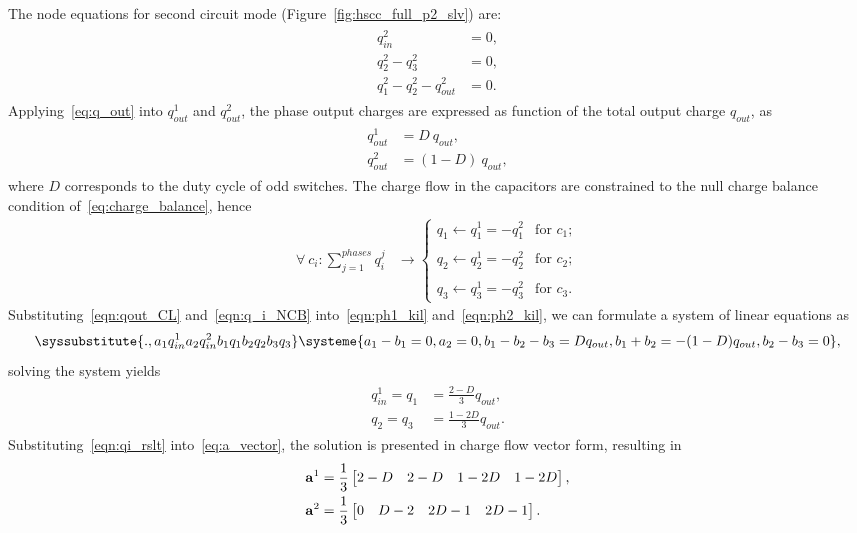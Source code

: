 The node equations for second circuit mode (Figure~\ref{fig:hscc_full_p2_slv}) are:
\begin{align}
\label{eqn:ph2_kil}
\begin{split}
  q_{in}^2 & = 0,\\
  q_2^2 - q_3^2    &=0, \\
  q_1^2 - q_2^2 - q_{out}^2 &=0.
\end{split}
\end{align}
Applying~\eqref{eq:q_out} into $q_{out}^1$ and $q_{out}^2$, the phase output charges are expressed as function of the total output charge $q_{out}$, as
\begin{align}
\label{eqn:qout_CL}
\begin{split}
  q_{out}^1 & = D~q_{out} ,\\
  q_{out}^2 & = (1-D)~q_{out},
\end{split}
\end{align}
where $D$ corresponds to the duty cycle of odd switches. The charge flow in the capacitors are constrained to the null charge balance condition of~\eqref{eq:charge_balance}, hence
\begin{align}
\label{eqn:q_i_NCB}
\forall~c_{i} : \sum_{j=1}^{phases}q_{i}^j & \rightarrow
    \begin{cases}
        q_1 \leftarrow q_1^1 =  - q_1^2 & \text{for } c_1;\\
        \\
        q_2 \leftarrow q_2^1 =  - q_2^2 & \text{for } c_2;\\
        \\
        q_3 \leftarrow q_3^1 =  - q_3^2 & \text{for } c_3.
    \end{cases}
\end{align}
Substituting~\eqref{eqn:qout_CL} and~\eqref{eqn:q_i_NCB} into~\eqref{eqn:ph1_kil} and~\eqref{eqn:ph2_kil}, we can formulate a system of linear equations as
\begin{equation}
  \syssubstitute{.,{a_1}{q_{in}^1}{a_2}{q_{in}^2}{b_1}{q_1}{b_2}{q_2}{b_3}{q_3}}
  \systeme{
    a_1  - b_1  = 0,
    a_2 = 0,
    b_1 - b_2  - b_3  = D q_{out},
    b_1 + b_2  =  - (1-D) q_{out},
    b_2 - b_3  = 0},
\end{equation}
solving the system yields
\begin{align}
\label{eqn:qi_rslt}
    \begin{split}
        q_{in}^1  = q_{1} & = \frac{2 -D}{3} q_{out} ,\\
        q_{2}     = q_3   & = \frac{1 - 2D}{3} q_{out}.
    \end{split}
\end{align}
Substituting~\eqref{eqn:qi_rslt} into~\eqref{eq:a_vector}, the solution is presented in charge flow vector form, resulting in
\begin{align}
\mathbf{a}^1 & = \frac{1}{3}\begin{bmatrix}2 - D & 2 - D & 1 - 2D & 1- 2D\end{bmatrix}, \\
\mathbf{a}^2 & = \frac{1}{3}\begin{bmatrix}0 & D - 2  & 2D -1  & 2D -1 \end{bmatrix}.
\label{eq:a_31dikson}
\end{align}


